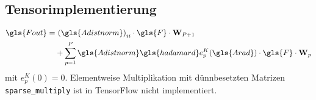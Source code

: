 \subsection{Tensorimplementierung}

\begin{equation}
\begin{split}
  \gls{Fout} = & \ {\left(\gls{Adistnorm}\right)}_{ii} \cdot \gls{F} \cdot \ma{W}_{P+1}\\
  & + \sum_{p=1}^P \gls{Adistnorm} \gls{hadamard} e^K_p\left(\gls{Arad}\right) \cdot \gls{F} \cdot \ma{W}_{p}
\end{split}
\end{equation}
mit $e_p^K(0) = 0$.
Elementweise Multiplikation mit dünnbesetzten Matrizen \texttt{sparse\_multiply} ist in TensorFlow nicht implementiert.


\newpage
